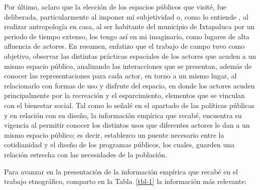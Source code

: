 \documentclass[
  spanish,
  11pt,
  a4paper,
]{scrbook}
\begin{document}
Por último, aclaro que la elección de los espacios públicos que visité,
fue deliberada, particularmente al imponer mi subjetividad o, como lo
entiende \textcite{Menendez2002}, al realizar antropología en casa, al
ser habitante del municipio de Ixtapaluca por un periodo de tiempo
extenso, los tengo así en mi imaginario, como lugares de alta afluencia
de actores. En resumen, enfatizo que el trabajo de campo tuvo como
objetivo, observar las distintas prácticas espaciales de los actores que
acuden a un mismo espacio público, analizando las interacciones que se
presentan, además de conocer las representaciones para cada actor, en
torno a un mismo lugar, al relacionarlo con formas de uso y disfrute del
espacio, en donde los actores acuden principalmente por la recreación y
el esparcimiento, elementos que se vinculan con el bienestar social. Tal
como lo señalé en el apartado de las políticas públicas y en relación
con su diseño, la información empírica que recabé, encuentra su vigencia
al permitir conocer los distintos usos que diferentes actores le dan a
un mismo espacio público; es decir, establezco un puente necesario entre
la cotidianidad y el diseño de los programas públicos, los cuales,
guarden una relación estrecha con las necesidades de la población.

Para avanzar en la presentación de la información empírica que recabé en
el trabajo etnográfico, comparto en la Tabla~\ref{tbl-1} la información
más relevante:

\begingroup
\scriptsize
\end{document}
